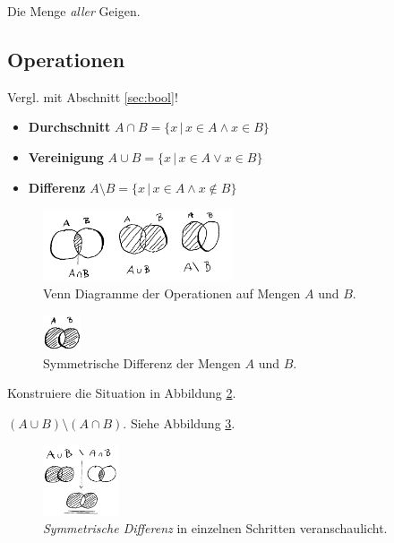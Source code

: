 Die Menge \emph{aller} Geigen.

\subsection{Operationen}

Vergl. mit Abschnitt \ref{sec:bool}!

\begin{itemize}
    \item \textbf{Durchschnitt} $ A \cap B = \{x \, | \, x \in A \land x \in B\}$
    \item \textbf{Vereinigung} $ A \cup B = \{x \, | \, x \in A \lor x \in B\}$
    \item \textbf{Differenz} $ A \setminus B = \{x \, | \, x \in A \land x \notin B\}$
\end{itemize}


\begin{figure}[h]
    \centering
    \includegraphics[width=0.5\textwidth]{img/mengenVenn.png}
    \caption{Venn Diagramme der Operationen auf Mengen $A$ und $B$.}
    \label{fig:vennMengen}
\end{figure}



\begin{figure}[h]
    \centering
    \includegraphics[width=0.1\textwidth]{img/mengen_symDiff.png}
    \caption{Symmetrische Differenz der Mengen $A$ und $B$.}
    \label{fig:venn_symDiff}
\end{figure}

\begin{question}
    Konstruiere die Situation in Abbildung \ref{fig:venn_symDiff}.
\end{question}

\begin{answer}
      $(A \cup B) \setminus (A \cap B)$. Siehe Abbildung \ref{fig:symDifSteps}.
\end{answer}

      \begin{figure}[h]
          \centering
          \includegraphics[width=0.2\textwidth]{img/symDifSteps.png}
          \caption{\emph{Symmetrische Differenz} in einzelnen Schritten veranschaulicht.}
          \label{fig:symDifSteps}
      \end{figure}


